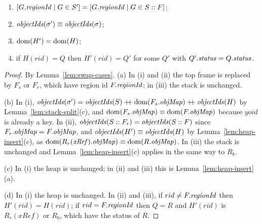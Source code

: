 
\begin{lemma}
\label{lem:swap-shape}
\begin{enumerate}[nosep,label=(\alph*)]
  \item $[G.\mathit{regionId} \mid G \in S'] = [G.\mathit{regionId} \mid G \in S :: F]$;
  \item $\mathit{objectIds}(\sigma') \equiv \mathit{objectIds}(\sigma)$; 
  \item $\mathrm{dom}(H') = \mathrm{dom}(H)$; 
  \item if $H(rid) = Q$ then $H'(rid) = Q'$ for some $Q'$ with $Q'.\mathit{status} = Q.\mathit{status}$.
\end{enumerate}
\end{lemma}
\begin{proof}
By Lemma~\ref{lem:swap-cases}.
(a) In (i) and (ii) the top frame is replaced by $F_s$ or $F_r$, which have region id $F.\mathit{regionId}$; in
(iii) the stack is unchanged.

(b) In (i), $\mathit{objectIds}(\sigma') = \mathit{objectIds}(S) \mathbin{+\!\!+} \mathrm{dom}(F_s.\mathit{objMap}) \mathbin{+\!\!+} \mathit{objectIds}(H)$ by
Lemma~\ref{lem:stack-split}(c), and $\mathrm{dom}(F_s.\mathit{objMap}) \equiv \mathrm{dom}(F.\mathit{objMap})$ because $yoid$ is already a
key. In (ii), $\mathit{objectIds}(S :: F_r) = \mathit{objectIds}(S :: F)$ since $F_r.\mathit{objMap} = F.\mathit{objMap}$, and
$\mathit{objectIds}(H') \equiv \mathit{objectIds}(H)$ by Lemma~\ref{lem:heap-insert}(c), as
$\mathrm{dom}(R_r(\mathit{xRef}).\mathit{objMap}) \equiv \mathrm{dom}(R.\mathit{objMap})$. In (iii) the stack is unchanged and
Lemma~\ref{lem:heap-insert}(c) applies in the same way to $R_b$.

(c) In (i) the heap is unchanged; in (ii) and (iii) this is Lemma~\ref{lem:heap-insert}(a).

(d) In (i) the heap is unchanged. In (ii) and (iii), if $rid \ne F.\mathit{regionId}$ then $H'(rid) = H(rid)$; if
$rid = F.\mathit{regionId}$ then $Q = R$ and $H'(rid)$ is $R_r(\mathit{xRef})$ or $R_b$, which have the status of
$R$.
\end{proof}

